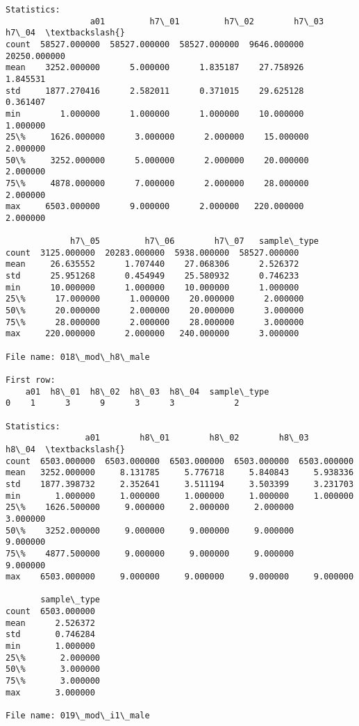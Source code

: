 \documentclass[11pt]{article}
\begin{document}
\begin{Verbatim}[commandchars=\\\{\}]
Statistics: 
                 a01         h7\_01         h7\_02        h7\_03         h7\_04  \textbackslash{}
count  58527.000000  58527.000000  58527.000000  9646.000000  20250.000000   
mean    3252.000000      5.000000      1.835187    27.758926      1.845531   
std     1877.270416      2.582011      0.371015    29.625128      0.361407   
min        1.000000      1.000000      1.000000    10.000000      1.000000   
25\%     1626.000000      3.000000      2.000000    15.000000      2.000000   
50\%     3252.000000      5.000000      2.000000    20.000000      2.000000   
75\%     4878.000000      7.000000      2.000000    28.000000      2.000000   
max     6503.000000      9.000000      2.000000   220.000000      2.000000   

             h7\_05         h7\_06        h7\_07   sample\_type  
count  3125.000000  20283.000000  5938.000000  58527.000000  
mean     26.635552      1.707440    27.068306      2.526372  
std      25.951268      0.454949    25.580932      0.746233  
min      10.000000      1.000000    10.000000      1.000000  
25\%      17.000000      1.000000    20.000000      2.000000  
50\%      20.000000      2.000000    20.000000      3.000000  
75\%      28.000000      2.000000    28.000000      3.000000  
max     220.000000      2.000000   240.000000      3.000000  

File name: 018\_mod\_h8\_male

First row: 
    a01  h8\_01  h8\_02  h8\_03  h8\_04  sample\_type
0    1      3      9      3      3            2

Statistics: 
                a01        h8\_01        h8\_02        h8\_03        h8\_04  \textbackslash{}
count  6503.000000  6503.000000  6503.000000  6503.000000  6503.000000   
mean   3252.000000     8.131785     5.776718     5.840843     5.938336   
std    1877.398732     2.352641     3.511194     3.503399     3.231703   
min       1.000000     1.000000     1.000000     1.000000     1.000000   
25\%    1626.500000     9.000000     2.000000     2.000000     3.000000   
50\%    3252.000000     9.000000     9.000000     9.000000     9.000000   
75\%    4877.500000     9.000000     9.000000     9.000000     9.000000   
max    6503.000000     9.000000     9.000000     9.000000     9.000000   

       sample\_type  
count  6503.000000  
mean      2.526372  
std       0.746284  
min       1.000000  
25\%       2.000000  
50\%       3.000000  
75\%       3.000000  
max       3.000000  

File name: 019\_mod\_i1\_male


\end{Verbatim}
\end{document}
